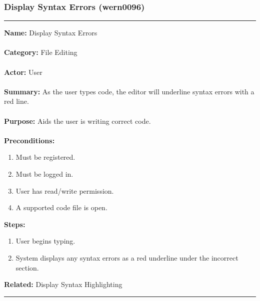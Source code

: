 \documentclass[11pt]{report}
\begin{document}
\subsubsection{Display Syntax Errors (wern0096)}
\vspace{2pt}
\hrule
\vspace{8pt}
	\noindent\textbf{Name:} Display Syntax Errors \\ \\
	\textbf{Category:} File Editing \\ \\
	\textbf{Actor:} User \\ \\
	\textbf{Summary:} As the user types code, the editor will underline syntax errors with a red line. \\ \\
	\textbf{Purpose:} Aids the user is writing correct code. \\ \\
	\textbf{Preconditions:} 
	\begin{enumerate}
		\item Must be registered.
		\item Must be logged in.
		\item User has read/write permission.
		\item A supported code file is open.
	\end{enumerate}
	\textbf{Steps:}
	\begin{enumerate}
		\item User begins typing.
		\item System displays any syntax errors as a red underline under the incorrect section.
	\end{enumerate}
	\textbf{Related:} Display Syntax Highlighting
\vspace{8pt}
\hrule

\newpage
\end{document}
